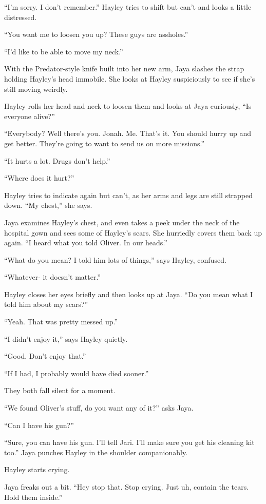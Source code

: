 ``I'm sorry.  I don't remember.''  Hayley tries to shift but can't and looks a little distressed.

``You want me to loosen you up?  These guys are assholes.''

``I'd like to be able to move my neck.''

With the Predator-style knife built into her new arm, Jaya slashes the strap holding Hayley's head immobile.  She looks at Hayley suspiciously to see if she's still moving weirdly.

Hayley rolls her head and neck to loosen them and looks at Jaya curiously, ``Is everyone alive?''

``Everybody?  Well there's you.  Jonah.  Me.   That's it.  You should hurry up and get better.  They're going to want to send us on more missions.''

``It hurts a lot.  Drugs don't help.''

``Where does it hurt?''

Hayley tries to indicate again but can't, as her arms and legs are still strapped down.  ``My chest,'' she says.

Jaya examines Hayley's chest, and even takes a peek under the neck of the hospital gown and sees some of Hayley's scars.  She hurriedly covers them back up again.  ``I heard what you told Oliver.  In our heads.''

``What do you mean?  I told him lots of things,'' says Hayley, confused.

``Whatever- it doesn't matter.''

Hayley closes her eyes briefly and then looks up at Jaya.  ``Do you mean what I told him about my scars?''

``Yeah.  That was pretty messed up.''

``I didn't enjoy it,'' says Hayley quietly.

``Good.  Don't enjoy that.''

``If I had, I probably would have died sooner.''

They both fall silent for a moment.

``We found Oliver's stuff, do you want any of it?'' asks Jaya.

``Can I have his gun?''

``Sure, you can have his gun.  I'll tell Jari.  I'll make sure you get his cleaning kit too.'' Jaya punches Hayley in the shoulder companionably.

Hayley starts crying.

Jaya freaks out a bit.  ``Hey stop that.  Stop crying.  Just uh, contain the tears.  Hold them inside.''

